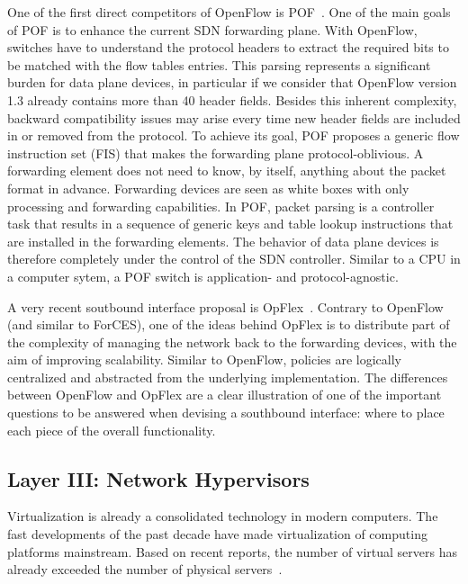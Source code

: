 One of the first direct competitors of OpenFlow is POF~\cite{song2013,song2013-1}.
One of the main goals of POF is to enhance the current SDN forwarding plane.
With OpenFlow, switches have to understand the protocol headers to extract the required bits to be matched with the flow tables entries.
This parsing represents a significant burden for data plane devices, in particular if we consider that OpenFlow version 1.3 already contains more  than 40 header fields. 
Besides this inherent complexity, backward compatibility issues may arise every time new header fields are included in or removed from the protocol.
To achieve its goal, POF proposes a generic flow  instruction set (FIS) that makes the forwarding plane protocol-oblivious.
A forwarding element does not need to know, by itself, anything about the packet format in advance.
Forwarding devices are seen as white boxes with only processing and forwarding  capabilities. 
In POF, packet parsing is a controller task that results in a sequence of generic keys and table lookup instructions that are installed in the forwarding elements.
The behavior of data plane devices is therefore completely under the control of the SDN controller.
Similar to a CPU in a computer sytem, a POF switch is application- and protocol-agnostic. 

A very recent soutbound interface proposal is OpFlex~\cite{smith2014}.
Contrary to OpenFlow (and similar to ForCES), one of the ideas behind OpFlex is to distribute part of the 
complexity of managing the network back to the forwarding devices, with the aim of improving scalability.
Similar to OpenFlow, policies are logically centralized and abstracted from the underlying implementation.
The differences between OpenFlow and OpFlex are a clear illustration of one of the important questions to be answered when devising a southbound interface: where to place each piece of the overall functionality. 

\subsection{Layer III: Network Hypervisors}
\label{sec:virtualizationhypervisor}

Virtualization is already a consolidated technology in modern computers. The fast 
developments of the past decade have made virtualization of computing platforms mainstream.
Based on recent reports, the number of virtual servers has already exceeded the number of physical 
servers~\cite{bittman2013,koponen}.


